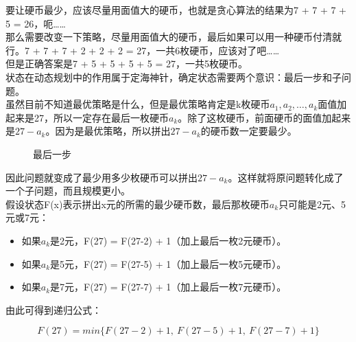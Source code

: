 要让硬币最少，应该尽量用面值大的硬币，也就是贪心算法的结果为7 + 7 + 7 + 5 = 26，呃……\\

那么需要改变一下策略，尽量用面值大的硬币，最后如果可以用一种硬币付清就行。7 + 7 + 7 + 2 + 2 + 2 = 27，一共6枚硬币，应该对了吧……\\

但是正确答案是7 + 5 + 5 + 5 + 5 = 27，一共5枚硬币。\\

状态在动态规划中的作用属于定海神针，确定状态需要两个意识：最后一步和子问题。\\

虽然目前不知道最优策略是什么，但是最优策略肯定是k枚硬币$ a_1, a_2, \dots, a_k $面值加起来是27，所以一定存在最后一枚硬币$ a_k $。除了这枚硬币，前面硬币的面值加起来是$ 27 - a_k $。因为是最优策略，所以拼出$ 27 - a_k $的硬币数一定要最少。\\

\begin{figure}[H]
	\centering
	\caption{最后一步}
\end{figure}

因此问题就变成了最少用多少枚硬币可以拼出$ 27 - a_k $。这样就将原问题转化成了一个子问题，而且规模更小。\\

假设状态F(x)表示拼出x元的所需的最少硬币数，最后那枚硬币$ a_k $只可能是2元、5元或7元：

\begin{itemize}
	\item 如果$ a_k $是2元，F(27) = F(27-2) + 1（加上最后一枚2元硬币）。

	\item 如果$ a_k $是5元，F(27) = F(27-5) + 1（加上最后一枚5元硬币）。

	\item 如果$ a_k $是7元，F(27) = F(27-7) + 1（加上最后一枚7元硬币）。
\end{itemize}

由此可得到递归公式：

\vspace{-0.5cm}

$$
	F(27) = min\{F(27-2)+1,\ F(27-5)+1,\ F(27-7)+1\}
$$

